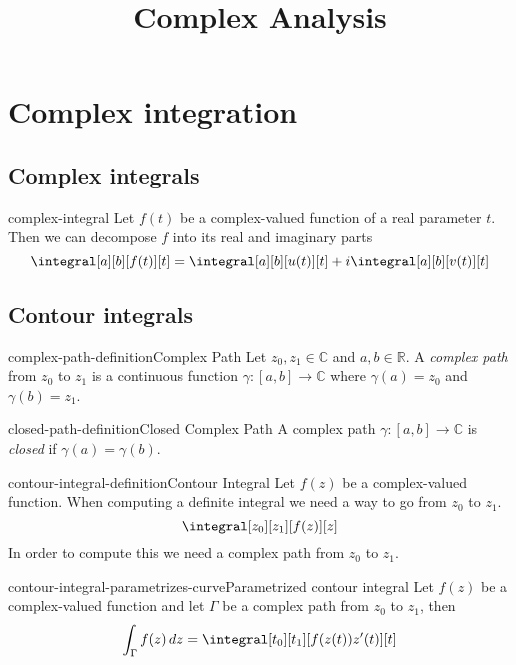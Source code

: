 \documentclass[preview]{standalone}
\begin{document}
  
\title{Complex Analysis}
\genpage

\section{Complex integration}

\subsection{Complex integrals}

\begin{snippet}{complex-integral}
Let \(f(t)\) be a complex-valued function of a real parameter \(t\). Then
we can decompose \(f\) into its real and imaginary parts
\[
    \integral[a][b][f(t)][t]=\integral[a][b][u(t)][t]+i\integral[a][b][v(t)][t]
\]
\end{snippet}

\subsection{Contour integrals}

\begin{snippetdefinition}{complex-path-definition}{Complex Path}{
    Let \(z_0, z_1 \in \mathbb{C}\) and \(a,b\in \mathbb{R}\).
    A \textit{complex path} from \(z_0\) to \(z_1\) is a continuous function
    \(\gamma\colon [a,b] \to \mathbb{C}\) where \(\gamma(a)=z_0\) and \(\gamma(b)=z_1\).
}
\end{snippetdefinition}

\begin{snippetdefinition}{closed-path-definition}{Closed Complex Path}{
    A complex path \(\gamma\colon [a,b] \to \mathbb{C}\)
    is \textit{closed} if \(\gamma(a)=\gamma(b)\).
}

\end{snippetdefinition}


\begin{snippetdefinition}{contour-integral-definition}{Contour Integral}{
    Let \(f(z)\) be a complex-valued function.
    When computing a definite integral we need a way to go from \(z_0\) to \(z_1\).
    \[
        \integral[z_0][z_1][f(z)][z]
    \]
    In order to compute this we need a complex path from \(z_0\) to \(z_1\).
}
\end{snippetdefinition}


\begin{snippettheorem}{contour-integral-parametrizes-curve}{Parametrized contour integral}{
    Let \(f(z)\) be a complex-valued function and
    let \(\Gamma\) be a complex path from \(z_0\) to \(z_1\), then
    \[
        \int_\Gamma f(z)\,dz = \integral[t_0][t_1][f(z(t))z'(t)][t]
    \]
}
\end{snippettheorem}
\end{document}
